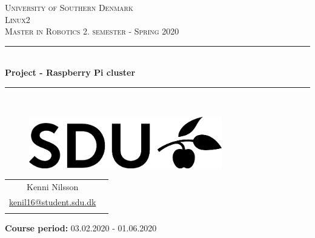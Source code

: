 \documentclass[Report.tex]{subfiles}
\begin{document}
\begin{titlepage}
\begin{center}
\textsc{\LARGE University of Southern Denmark}\\[1.5cm]

\textsc{Linux2}\\[0.5cm]

\textsc{\large Master in Robotics 2. semester - Spring 2020}\\[0.5cm]
\rule{\linewidth}{0.5mm}\\[0.2cm]
{ \LARGE \bfseries Project - Raspberry Pi cluster  \\[0.4cm]}
\rule{\linewidth}{0.5mm}\\[1.2cm]

\vspace{2.5cm}

    \begin{figure}[h!]
    \centering
    \includegraphics[width=0.75\textwidth]{../Figures/SDUlogo.png}
    \label{fig:SDUlogo}\\
    [2.5cm]
    \end{figure}


\begin{tabular}{cc}
	\cline{1-1}
	\\
    Kenni Nilsson\\
    \href{mailto:kenil16@student.sdu.dk}{kenil16@student.sdu.dk} \\
	\\	
\end{tabular}	

\vfill

\textbf{Course period:} 03.02.2020 - 01.06.2020\\
\end{center}
\end{titlepage}
\end{document}
